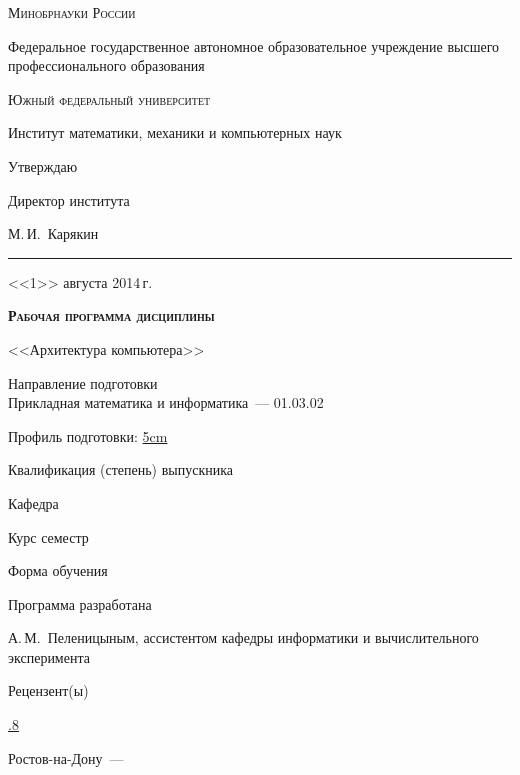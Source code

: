 

\date{2014}


  \thispagestyle {empty}\large
  \begin{spacing}{1.1}
  \begin {center}
    \textsc{Минобрнауки России}

    \vgap
    Федеральное государственное автономное образовательное
    учреждение высшего профессионального образования

    \textsc{Южный федеральный университет}

    \vgap
    Институт математики, механики и компьютерных наук
  \end {center}
    \vgap
	\hfill 
	\begin{minipage}{0.45\textwidth}
	\begin{center}
	Утверждаю

	Директор института

	\vspace{2\baselineskip}
	\hfill М.\,И.~Карякин
	\hrule

	\vspace{.5\baselineskip}
	<<1>> августа 2014\,г. 
	\end{center}
	\end{minipage}
    
  \vgap
  \begin {center}
    {\LARGE\bfseries
    \textsc{Рабочая программа дисциплины}
    
    <<Архитектура компьютера>>\par
    }

    \vgap
    Направление подготовки\\
    Прикладная математика и информатика~--- 01.03.02

    \vgap
    Профиль подготовки: \uline{5cm}

    \vgap
    Квалификация (степень) выпускника\\

    \vgap
    Кафедра 

    \vgap
    Курс     семестр 

    \vgap
    Форма обучения 

    \vgap
    Программа разработана \hfill
	\begin{minipage}[t]{.65\textwidth}
	\begin{flushleft}
	А.\,М.~Пеленицыным, ассистентом кафедры информатики и вычислительного эксперимента
	\end{flushleft}
	\end{minipage}

	\vgap
	\begin{flushleft}
	Рецензент(ы)
	\end{flushleft}
	\uline{.8\textwidth}
  \end {center}
  \vspace {\fill}
  \begin {center}
    Ростов-на-Дону~--- \thedate
  \end {center}
  \end{spacing}
  \clearpage\normalsize

